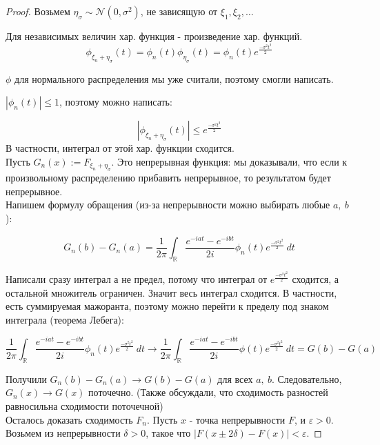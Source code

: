  \begin{proof}
     Возьмем $\eta_\sigma \sim \mathcal{N}(0, \sigma^2)$, не зависящую от $\xi_1, \xi_2, \dots$\
     
     Для независимых величин хар. функция - произведение хар. функций.
     \[ 
        \phi_{\xi_n + \eta_\sigma}(t) = \phi_n(t) \phi_{\eta_\sigma}(t) = \phi_n(t)e^{\frac{-\sigma^2t^2}{2}}
     \]
     
     $\phi$ для нормального распределения мы уже считали, поэтому смогли написать.
     
     $|\phi_n(t)| \leq 1$, поэтому можно написать:
     
     \[|\phi_{\xi_n + \eta_\sigma}(t)| \leq e^{\frac{-\sigma^2t^2}{2}}\]
     В частности, интеграл от этой хар. функции сходится.\\
     
     Пусть $G_n(x) := F_{\xi_n + \eta_\sigma}$. Это непрерывная функция: мы доказывали, что если к произвольному распределению прибавить непрерывное, то результатом будет непрерывное.\\
     
     Напишем формулу обращения (из-за непрерывности можно выбирать любые $a,\ b$):
     
     \[ G_n(b) - G_n(a) = \frac{1}{2\pi} \int_{\mathbb{R}} \frac{e^{-iat}-e^{-ibt}}{2i}\phi_n(t) e^{\frac{-\sigma^2 t^2}{2}}\ dt \]
     
     Написали сразу интеграл а не предел, потому что интеграл от $e^\frac{-\sigma^2t^2}{2}$ сходится, а остальной множитель ограничен. Значит весь интеграл сходится. В частности, есть суммируемая мажоранта, поэтому можно перейти к пределу под знаком интеграла (теорема Лебега):
     
     \[
        \frac{1}{2\pi} \int_{\mathbb{R}} \frac{e^{-iat}-e^{-ibt}}{2i}\phi_n(t) e^{\frac{-\sigma^2 t^2}{2}}\ dt \to
        \frac{1}{2\pi} \int_{\mathbb{R}} \frac{e^{-iat}-e^{-ibt}}{2i}\phi(t) e^{\frac{-\sigma^2 t^2}{2}}\ dt = G(b) - G(a)
     \]
     
     Получили $G_n(b) - G_n(a) \to G(b) - G(a)$ для всех $a,\ b$. Следовательно, $G_n(x) \to G(x)$ поточечно. (Также обсуждали, что сходимость разностей равносильна сходимости поточечной)\\
     
     Осталось доказать сходимость $F_n$. Пусть $x$ - точка непрерывности $F$, и $\varepsilon > 0$. Возьмем из непрерывности $\delta > 0$, такое что $|F(x \pm 2\delta) - F(x)| < \varepsilon$.
     

\end{proof}
